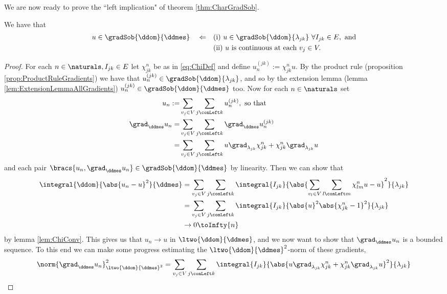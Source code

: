 We are now ready to prove the ``left implication" of theorem \ref{thm:CharGradSob}.
\begin{prop} \label{prop:CharGradSobLeftImplies}
	We have that
	\begin{align*}
		u\in\gradSob{\ddom}{\ddmes} \quad \Leftarrow 
		&\quad\text{(i)} \ u\in\gradSob{\ddom}{\lambda_{jk}} \ \forall I_{jk}\in E, \text{ and}\\
		&\quad\text{(ii)} \ u \text{ is continuous at each } v_j\in V.
	\end{align*}
\end{prop}
\begin{proof}
	For each $n\in\naturals, I_{jk}\in E$ let $\chi_{jk}^n$ be as in \eqref{eq:ChiDef} and define $u_n^{(jk)} := \chi_{jk}^n u$.
	By the product rule (proposition \ref{prop:ProductRuleGradients}) we have that $u_n^{(jk)}\in\gradSob{\ddom}{\lambda_{jk}}$, and so by the extension lemma (lemma \ref{lem:ExtensionLemmaAllGradients}) $u_n^{(jk)}\in\gradSob{\ddom}{\ddmes}$ too.
	Now for each $n\in\naturals$ set
	\begin{align*}
		u_n := &\sum_{v_j\in V}\sum_{j\conLeft k}u_n^{(jk)}, \text{ so that } \\
		\grad_\ddmes u_n = &\sum_{v_j\in V}\sum_{j\conLeft k} \grad_{\ddmes}u_n^{(jk)} \\
		= &\sum_{v_j\in V}\sum_{j\conLeft k} u\grad_{\lambda_{jk}}\chi_{jk}^n + \chi_{jk}^n\grad_{\lambda_{jk}}u
	\end{align*}
	and each pair $\bracs{u_n, \grad_\ddmes u_n}\in\gradSob{\ddom}{\ddmes}$ by linearity.
	Then we can show that
	\begin{align*}
		\integral{\ddom}{\abs{ u_n - u }^2}{\ddmes}
		&= \sum_{v_j\in V}\sum_{j\conLeft k}\integral{I_{jk}}{\abs{ \sum_{v_l\in V}\sum_{l\conLeft m}\chi_{lm}^n u - u }^2}{\lambda_{jk}} \\
		&= \sum_{v_j\in V}\sum_{j\conLeft k}\integral{I_{jk}}{\abs{u}^2\abs{ \chi_{jk}^n - 1 }^2}{\lambda_{jk}} \\
		&\rightarrow 0 \toInfty{n}
	\end{align*}
	by lemma \ref{lem:ChiConv}.
	This gives us that $u_n\rightarrow u$ in $\ltwo{\ddom}{\ddmes}$, and we now want to show that $\grad_{\ddmes}u_n$ is a bounded sequence.
	To this end we can make some progress estimating the $\ltwo{\ddom}{\ddmes}^2$-norm of these gradients,
	\begin{align*}
		\norm{\grad_{\ddmes}u_n}_{\ltwo{\ddom}{\ddmes}^2}^2
		&= \sum_{v_j\in V}\sum_{j\conLeft k} \integral{I_{jk}}{\abs{ u\grad_{\lambda_{jk}}\chi_{jk}^n + \chi_{jk}^n\grad_{\lambda_{jk}}u }^2}{\lambda_{jk}} \\

\end{align*}
\end{proof}
